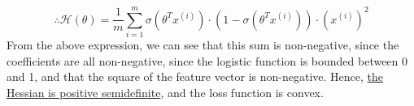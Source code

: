 \begin{equation*}
    \therefore
    \boxed{
        \mathcal{H}(\theta)
        =
        \frac{1}{m} \sum_{i=1}^{m}
        \sigma\left(\theta^{T} x^{(i)}\right) \cdot \left(1-\sigma\left(\theta^{T} x^{(i)}\right)\right)
        \cdot {\left(x^{(i)}\right)}^2
    }
\end{equation*}
From the above expression, we can see that this sum is non-negative, since the coefficients are all non-negative, since the logistic function is bounded between 0 and 1, and that the square of the feature vector is non-negative.
Hence, \underline{the Hessian is positive semidefinite}, and the loss function is convex.
